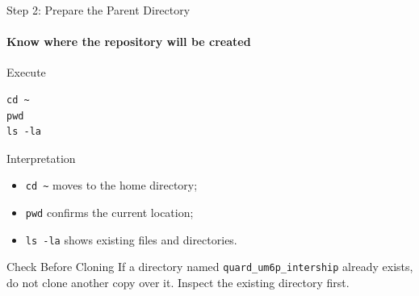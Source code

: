 \begin{frame}[fragile]{Step 2: Prepare the Parent Directory}
\framesubtitle{Know where the repository will be created}

\footnotesize

\begin{block}{Execute}
\begin{verbatim}
cd ~
pwd
ls -la
\end{verbatim}
\end{block}

\begin{exampleblock}{Interpretation}
\begin{itemize}
    \setlength{\itemsep}{0.20em}
    \item \texttt{cd \textasciitilde} moves to the home directory;
    \item \texttt{pwd} confirms the current location;
    \item \texttt{ls -la} shows existing files and directories.
\end{itemize}
\end{exampleblock}

\begin{alertblock}{Check Before Cloning}
If a directory named \texttt{quard\_um6p\_intership} already exists,
do not clone another copy over it. Inspect the existing directory first.
\end{alertblock}

\end{frame}

